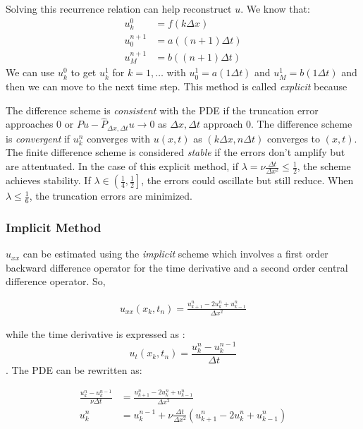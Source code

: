 \documentclass[12pt]{article}
\begin{document}
Solving this recurrence relation can help reconstruct $u$. We know that:
\begin{align*}
    u_k^0 &= f(k\Delta x) \\
    u_0^{n + 1} &= a((n + 1) \Delta t) \\
    u_M^{n + 1} &= b((n + 1) \Delta t)
\end{align*}
We can use $u_k^0$ to get $u_k^1$ for $k = 1, \ldots$ with $u_0^1 = a(1\Delta t)$ and $u_M^1 = b(1\Delta t)$ and then we can move to the next time step. This method is called \textit{explicit} because


The difference scheme is \textit{consistent} with the PDE if the truncation error approaches $0$ or $P u - \widehat{P}_{\Delta x, \Delta t} u \to 0$ as $\Delta x, \Delta t $ approach $0$. The difference scheme is \textit{convergent} if $u_k^n$ converges with $u(x, t)$ as $(k \Delta x, n \Delta t)$ converges to $(x, t)$. The finite difference scheme is considered \textit{stable} if the errors don't amplify but are attentuated. In the case of this explicit method, if $\lambda =  \nu \frac{\Delta t}{\Delta x^2} \leq \frac{1}{2}$, the scheme achieves stability. If $\lambda \in \left(\frac{1}{4}, \frac{1}{2}\right]$, the errors could oscillate but still reduce. When $\lambda \leq \frac{1}{6}$, the truncation errors are minimized. 

\subsubsection{Implicit Method}

$u_{xx}$ can be estimated using the \textit{implicit} scheme which involves a first order backward difference operator for the time derivative and a second order central difference operator. So, 

\begin{align*}
    u_{xx}(x_k, t_n) = \frac{u_{k + 1}^n - 2u_k^n + u^n_{k - 1}}{\Delta x^2}
\end{align*}

while the time derivative is expressed as : $$u_t(x_k, t_n) = \frac{u^{n}_{k} - u^{n - 1}_{k}}{\Delta t}$$. The PDE can be rewritten as:

\begin{align*}
    \frac{u^{n}_{k} - u^{n - 1}_{k}}{\nu \Delta t} &=  \frac{u_{k + 1}^n - 2u_k^n + u^n_{k - 1}}{\Delta x^2} \\
    u^{n}_{k} &= u^{n - 1}_{k} + \nu \frac{\Delta t}{\Delta x^2}\left(u_{k + 1}^n - 2u_k^n + u^n_{k - 1}\right)
\end{align*}
\end{document}
